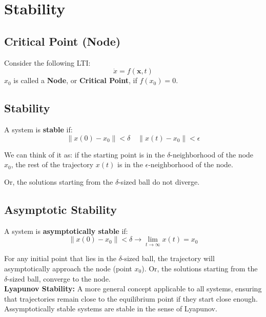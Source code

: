 
\section{Stability}


\subsection{Critical Point (Node)}

\begin{tcolorbox}[colback=green!10,colframe=green!50!black,title=\textbf{Critical Point (Node)}]
Consider the following LTI:
\[
\dot{x} = f(\mathbf{x}, t)
\]
\(x_0\) is called a \textbf{Node}, or \textbf{Critical Point}, if \(f(x_0) = 0\).
\end{tcolorbox}

\subsection{Stability}
\begin{tcolorbox}
A system is \textbf{stable} if:
\[
\|x(0) - x_0 \| < \delta \quad \| x(t) -x_0\| < \epsilon
\]
\end{tcolorbox}

We can think of it as: if the starting point is in the $\delta$-neighborhood of the node $x_0$, 
the rest of the trajectory $x(t)$ is in the $\epsilon$-neighborhood of the node.

Or, the solutions starting from the $\delta$-sized ball do not diverge. 

\subsection*{Asymptotic Stability}

\begin{tcolorbox}
A system is \textbf{asymptotically stable} if:
\[
\|x(0) - x_0 \| < \delta \to \lim_{t \to \infty} x(t) = x_0 
\]
\end{tcolorbox}

For any initial point that lies in the \(\delta\)-sized ball, the trajectory will asymptotically approach the node (point $x_0$).
Or, the solutions starting from the \(\delta\)-sized ball, converge to the node. \\

\textbf{Lyapunov Stability:} A more general concept applicable to all systems, ensuring that trajectories remain close to the equilibrium point if they start close enough.
Assymptotically stable systems are stable in the sense of Lyapunov.


